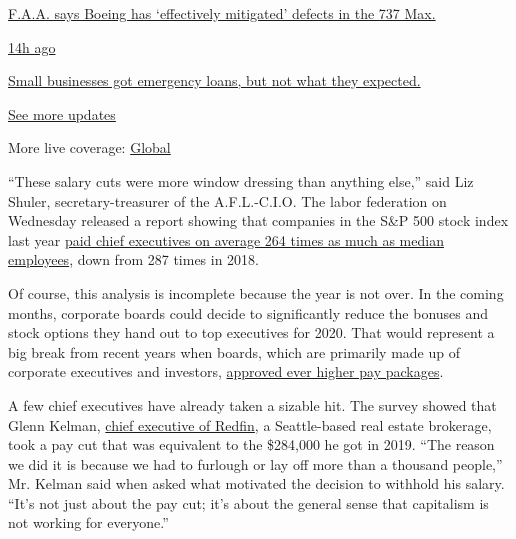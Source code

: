 \href{https://www.nytimes3xbfgragh.onion/live/2020/08/03/business/stock-market-today-coronavirus?action=click\&pgtype=Article\&state=default\&region=MAIN_CONTENT_1\&context=storylines_live_updates\#faa-says-boeing-has-effectively-mitigated-defects-in-the-737-max}{F.A.A.
says Boeing has `effectively mitigated' defects in the 737 Max.}

\href{https://www.nytimes3xbfgragh.onion/live/2020/08/03/business/stock-market-today-coronavirus?action=click\&pgtype=Article\&state=default\&region=MAIN_CONTENT_1\&context=storylines_live_updates\#small-businesses-got-emergency-loans-but-not-what-they-expected}{14h
ago}

\href{https://www.nytimes3xbfgragh.onion/live/2020/08/03/business/stock-market-today-coronavirus?action=click\&pgtype=Article\&state=default\&region=MAIN_CONTENT_1\&context=storylines_live_updates\#small-businesses-got-emergency-loans-but-not-what-they-expected}{Small
businesses got emergency loans, but not what they expected.}

\href{https://www.nytimes3xbfgragh.onion/live/2020/08/03/business/stock-market-today-coronavirus?action=click\&pgtype=Article\&state=default\&region=MAIN_CONTENT_1\&context=storylines_live_updates}{See
more updates}

More live coverage:
\href{https://www.nytimes3xbfgragh.onion/2020/08/03/world/coronavirus-covid-19.html?action=click\&pgtype=Article\&state=default\&region=MAIN_CONTENT_1\&context=storylines_live_updates}{Global}

``These salary cuts were more window dressing than anything else,'' said
Liz Shuler, secretary-treasurer of the A.F.L.-C.I.O. The labor
federation on Wednesday released a report showing that companies in the
S\&P 500 stock index last year \href{https://aflcio.org/paywatch}{paid
chief executives on average 264 times as much as median employees}, down
from 287 times in 2018.

Of course, this analysis is incomplete because the year is not over. In
the coming months, corporate boards could decide to significantly reduce
the bonuses and stock options they hand out to top executives for 2020.
That would represent a big break from recent years when boards, which
are primarily made up of corporate executives and investors,
\href{https://www.nytimes3xbfgragh.onion/2019/05/24/business/highest-paid-ceos-2018.html}{approved
ever higher pay packages}.

A few chief executives have already taken a sizable hit. The survey
showed that Glenn Kelman,
\href{https://www.nytimes3xbfgragh.onion/2016/07/10/technology/a-start-up-shies-away-from-the-gig-economy.html}{chief
executive of Redfin}, a Seattle-based real estate brokerage, took a pay
cut that was equivalent to the \$284,000 he got in 2019. ``The reason we
did it is because we had to furlough or lay off more than a thousand
people,'' Mr. Kelman said when asked what motivated the decision to
withhold his salary. ``It's not just about the pay cut; it's about the
general sense that capitalism is not working for everyone.''

